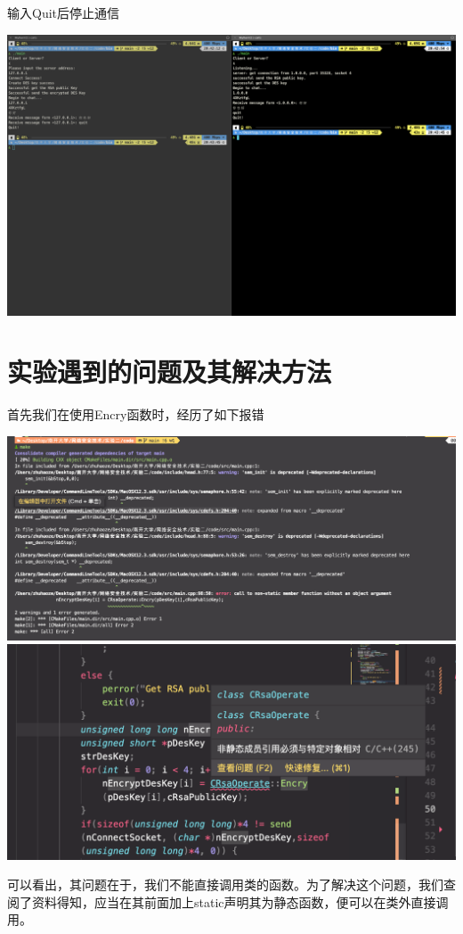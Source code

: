 \documentclass[UTF8,a4paper,10pt]{ctexart}
\begin{document}
输入Quit后停止通信
\begin{center}
  \includegraphics[scale = 0.23]{4.png}
\end{center}


\section{实验遇到的问题及其解决方法}
首先我们在使用Encry函数时，经历了如下报错
\begin{center}
  \includegraphics*[scale = 0.3]{截屏2022-04-07 00.34.42.png}
  \includegraphics*[scale = 0.5]{截屏2022-04-07 00.35.02.png}
\end{center}
可以看出，其问题在于，我们不能直接调用类的函数。为了解决这个问题，我们查阅了资料得知，应当在其前面加上static声明其为静态函数，便可以在类外直接调用。
\end{document}
